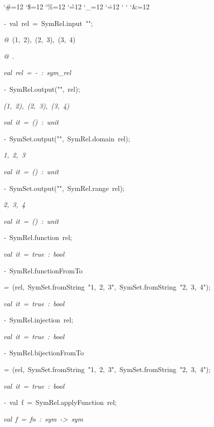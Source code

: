 \begin{list}{}
{\setlength{\leftmargin}{\leftmargini}
\setlength{\rightmargin}{0cm}
\setlength{\itemindent}{0cm}
\setlength{\listparindent}{0cm}
\setlength{\itemsep}{0cm}
\setlength{\parsep}{0cm}
\setlength{\labelsep}{0cm}
\setlength{\labelwidth}{0cm}
\catcode`\#=12
\catcode`\$=12
\catcode`\%=12
\catcode`\^=12
\catcode`\_=12
\catcode`\.=12
\catcode`
\catcode`
\catcode`\&=12
\ttfamily}
\small
\item[]\textsl{-\ }val\ rel\ =\ SymRel.input\ "";
\item[]\textsl{@\ }(1,\ 2),\ (2,\ 3),\ (3,\ 4)
\item[]\textsl{@\ }.
\item[]\textsl{val\ rel\ =\ -\ :\ sym_rel}
\item[]\textsl{-\ }SymRel.output("",\ rel);
\item[]\textsl{(1,\ 2),\ (2,\ 3),\ (3,\ 4)}
\item[]\textsl{val\ it\ =\ ()\ :\ unit}
\item[]\textsl{-\ }SymSet.output("",\ SymRel.domain\ rel);
\item[]\textsl{1,\ 2,\ 3}
\item[]\textsl{val\ it\ =\ ()\ :\ unit}
\item[]\textsl{-\ }SymSet.output("",\ SymRel.range\ rel);
\item[]\textsl{2,\ 3,\ 4}
\item[]\textsl{val\ it\ =\ ()\ :\ unit}
\item[]\textsl{-\ }SymRel.function\ rel;
\item[]\textsl{val\ it\ =\ true\ :\ bool}
\item[]\textsl{-\ }SymRel.functionFromTo
\item[]\textsl{=\ }(rel,\ SymSet.fromString\ "1,\ 2,\ 3",\ SymSet.fromString\ "2,\ 3,\ 4");
\item[]\textsl{val\ it\ =\ true\ :\ bool}
\item[]\textsl{-\ }SymRel.injection\ rel;
\item[]\textsl{val\ it\ =\ true\ :\ bool}
\item[]\textsl{-\ }SymRel.bijectionFromTo
\item[]\textsl{=\ }(rel,\ SymSet.fromString\ "1,\ 2,\ 3",\ SymSet.fromString\ "2,\ 3,\ 4");
\item[]\textsl{val\ it\ =\ true\ :\ bool}
\item[]\textsl{-\ }val\ f\ =\ SymRel.applyFunction\ rel;
\item[]\textsl{val\ f\ =\ fn\ :\ sym\ ->\ sym}

\end{list}
